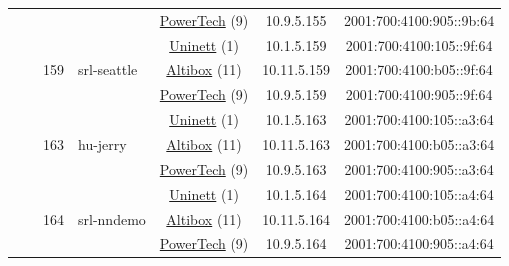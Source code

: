 \begin{small}
\begin{center}
\begin{longtable}{|c|c|c|c|c|c|c|c|}
  &  &  &  & \multicolumn{2}{|c|}{\tiny{\href{http://www.powertech.no}{PowerTech} (9)}} & \tiny{10.9.5.155} & \tiny{2001:700:4100:905::9b:64} \\* \cline{3-3}\cline{4-4}\cline{5-5}\cline{6-6}\cline{7-7}\cline{8-8}
  &  & \multirow{3}{*}{\tiny{159}} & \multicolumn{1}{|l|}{\multirow{3}{*}{\tiny{srl-seattle}}} & \multicolumn{2}{|c|}{\tiny{\href{https://www.uninett.no}{Uninett} (1)}} & \tiny{10.1.5.159} & \tiny{2001:700:4100:105::9f:64} \\* \cline{5-5}\cline{6-6}\cline{7-7}\cline{8-8}
  &  &  &  & \multicolumn{2}{|c|}{\tiny{\href{https://www.altibox.no}{Altibox} (11)}} & \tiny{10.11.5.159} & \tiny{2001:700:4100:b05::9f:64} \\* \cline{5-5}\cline{6-6}\cline{7-7}\cline{8-8}
  &  &  &  & \multicolumn{2}{|c|}{\tiny{\href{http://www.powertech.no}{PowerTech} (9)}} & \tiny{10.9.5.159} & \tiny{2001:700:4100:905::9f:64} \\* \cline{3-3}\cline{4-4}\cline{5-5}\cline{6-6}\cline{7-7}\cline{8-8}
  &  & \multirow{3}{*}{\tiny{163}} & \multicolumn{1}{|l|}{\multirow{3}{*}{\tiny{hu-jerry}}} & \multicolumn{2}{|c|}{\tiny{\href{https://www.uninett.no}{Uninett} (1)}} & \tiny{10.1.5.163} & \tiny{2001:700:4100:105::a3:64} \\* \cline{5-5}\cline{6-6}\cline{7-7}\cline{8-8}
  &  &  &  & \multicolumn{2}{|c|}{\tiny{\href{https://www.altibox.no}{Altibox} (11)}} & \tiny{10.11.5.163} & \tiny{2001:700:4100:b05::a3:64} \\* \cline{5-5}\cline{6-6}\cline{7-7}\cline{8-8}
  &  &  &  & \multicolumn{2}{|c|}{\tiny{\href{http://www.powertech.no}{PowerTech} (9)}} & \tiny{10.9.5.163} & \tiny{2001:700:4100:905::a3:64} \\* \cline{3-3}\cline{4-4}\cline{5-5}\cline{6-6}\cline{7-7}\cline{8-8}
  &  & \multirow{3}{*}{\tiny{164}} & \multicolumn{1}{|l|}{\multirow{3}{*}{\tiny{srl-nndemo}}} & \multicolumn{2}{|c|}{\tiny{\href{https://www.uninett.no}{Uninett} (1)}} & \tiny{10.1.5.164} & \tiny{2001:700:4100:105::a4:64} \\* \cline{5-5}\cline{6-6}\cline{7-7}\cline{8-8}
  &  &  &  & \multicolumn{2}{|c|}{\tiny{\href{https://www.altibox.no}{Altibox} (11)}} & \tiny{10.11.5.164} & \tiny{2001:700:4100:b05::a4:64} \\* \cline{5-5}\cline{6-6}\cline{7-7}\cline{8-8}
  &  &  &  & \multicolumn{2}{|c|}{\tiny{\href{http://www.powertech.no}{PowerTech} (9)}} & \tiny{10.9.5.164} & \tiny{2001:700:4100:905::a4:64} \\* \cline{3-3}\cline{4-4}\cline{5-5}\cline{6-6}\cline{7-7}\cline{8-8}

\end{longtable}
\end{center}
\end{small}
